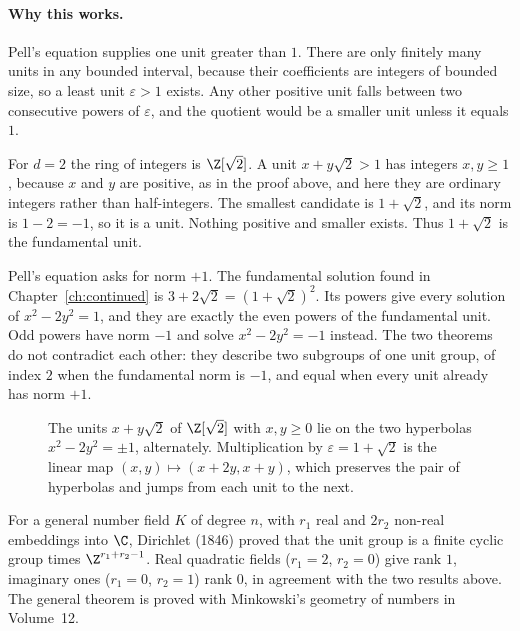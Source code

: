 \paragraph{Why this works.}
Pell's equation supplies one unit greater than $1$. There are only finitely many units in any bounded interval, because their coefficients are integers of bounded size, so a least unit $\varepsilon>1$ exists. Any other positive unit falls between two consecutive powers of $\varepsilon$, and the quotient would be a smaller unit unless it equals $1$.

\begin{examplex}
For $d=2$ the ring of integers is $\Z[\sqrt2]$. A unit $x+y\sqrt2>1$ has integers $x,y\ge1$, because $x$ and $y$ are positive, as in the proof above, and here they are ordinary integers rather than half-integers. The smallest candidate is $1+\sqrt2$, and its norm is $1-2=-1$, so it is a unit. Nothing positive and smaller exists. Thus $1+\sqrt2$ is the fundamental unit.

Pell's equation asks for norm $+1$. The fundamental solution found in Chapter~\ref{ch:continued} is $3+2\sqrt2=(1+\sqrt2)^2$. Its powers give every solution of $x^2-2y^2=1$, and they are exactly the even powers of the fundamental unit. Odd powers have norm $-1$ and solve $x^2-2y^2=-1$ instead. The two theorems do not contradict each other: they describe two subgroups of one unit group, of index $2$ when the fundamental norm is $-1$, and equal when every unit already has norm $+1$.
\end{examplex}

\begin{figure}[ht]
\centering
{}
\caption{The units $x+y\sqrt2$ of $\Z[\sqrt2]$ with $x,y\ge0$ lie on the two hyperbolas $x^2-2y^2=\pm1$, alternately. Multiplication by $\varepsilon=1+\sqrt2$ is the linear map $(x,y)\mapsto(x+2y,x+y)$, which preserves the pair of hyperbolas and jumps from each unit to the next.}
\label{fig:units}
\end{figure}

\begin{remark}
For a general number field $K$ of degree $n$, with $r_1$ real and $2r_2$ non-real embeddings into $\C$, Dirichlet (1846) proved that the unit group is a finite cyclic group times $\Z^{r_1+r_2-1}$. Real quadratic fields ($r_1=2$, $r_2=0$) give rank $1$, imaginary ones ($r_1=0$, $r_2=1$) rank $0$, in agreement with the two results above. The general theorem is proved with Minkowski's geometry of numbers in Volume~12.
\end{remark}

